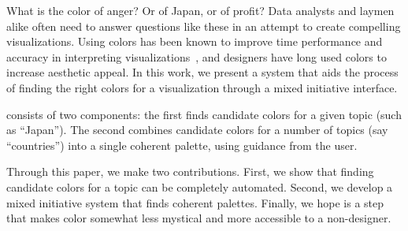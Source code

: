 What is the color of anger? Or of Japan, or of profit? Data analysts and laymen alike often need to answer questions like these in an attempt to create compelling visualizations. Using colors has been known to improve time performance and accuracy in interpreting visualizations~\cite{hoadley1990investigating}, and designers have long used colors to increase aesthetic appeal. In this work, we present a system that aids the process of finding the right colors for a visualization through a mixed initiative interface.

\system consists of two components: the first finds candidate colors for a given topic (such as ``Japan''). The second combines candidate colors for a number of topics (say ``countries'') into a single coherent palette, using guidance from the user.

Through this paper, we make two contributions. First, we show that finding candidate colors for a topic can be completely automated. Second, we develop a mixed initiative system that finds coherent palettes. Finally, we hope \system is a step that makes color somewhat less mystical and more accessible to a non-designer.
